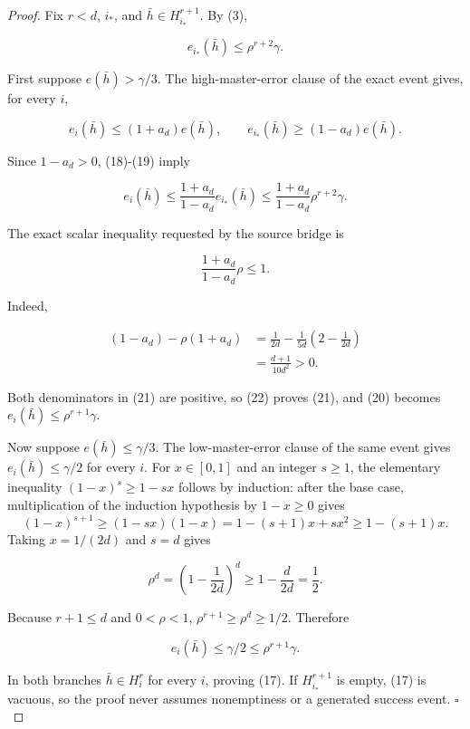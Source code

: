 \begin{proof}
Fix \(r<d\), \(i_*\), and
\(\bar h\in H_{i_*}^{r+1}\). By (3),

\[
 e_{i_*}(\bar h)\le\rho^{r+2}\gamma.
\tag{18}
\]

First suppose \(e(\bar h)>\gamma/3\). The high-master-error clause of the
exact  event gives, for every \(i\),

\[
 e_i(\bar h)\le(1+a_d)e(\bar h),
 \qquad
 e_{i_*}(\bar h)\ge(1-a_d)e(\bar h).
\tag{19}
\]

Since \(1-a_d>0\), (18)-(19) imply

\[
 e_i(\bar h)
 \le \frac{1+a_d}{1-a_d}e_{i_*}(\bar h)
 \le \frac{1+a_d}{1-a_d}\rho^{r+2}\gamma.
\tag{20}
\]

The exact scalar inequality requested by the source bridge is

\[
 \frac{1+a_d}{1-a_d}\rho\le1.
\tag{21}
\]

Indeed,

\[
\begin{aligned}
 (1-a_d)-\rho(1+a_d)
 &=\frac{1}{2d}-\frac{1}{5d}
      \left(2-\frac{1}{2d}\right)\\
 &=\frac{d+1}{10d^2}>0.
\end{aligned}
\tag{22}
\]

Both denominators in (21) are positive, so (22) proves (21), and (20)
becomes \(e_i(\bar h)\le\rho^{r+1}\gamma\).

Now suppose \(e(\bar h)\le\gamma/3\). The low-master-error clause of the
same  event gives \(e_i(\bar h)\le\gamma/2\) for every \(i\).
For \(x\in[0,1]\) and an integer \(s\ge1\), the elementary inequality
\((1-x)^s\ge1-sx\) follows by induction: after the base case, multiplication
of the induction hypothesis by \(1-x\ge0\) gives
\[
 (1-x)^{s+1}\ge(1-sx)(1-x)
 =1-(s+1)x+sx^2\ge1-(s+1)x.
\]
Taking \(x=1/(2d)\) and \(s=d\) gives

\[
 \rho^d=\left(1-\frac{1}{2d}\right)^d
 \ge1-\frac{d}{2d}=\frac12.
\tag{23}
\]

Because \(r+1\le d\) and \(0<\rho<1\),
\(\rho^{r+1}\ge\rho^d\ge1/2\). Therefore

\[
 e_i(\bar h)\le\gamma/2\le\rho^{r+1}\gamma.
\tag{24}
\]

In both branches \(\bar h\in H_i^r\) for every \(i\), proving (17).
If \(H_{i_*}^{r+1}\) is empty, (17) is vacuous, so the proof never assumes
nonemptiness or a generated success event. \(\square\)


\end{proof}

